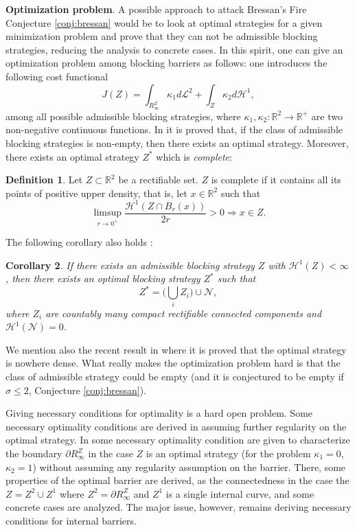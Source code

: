 \documentclass[reqno]{amsart}
\newcounter{assu}
\theoremstyle{definition} \newtheorem{definition}{Definition}[section]
\theoremstyle{definition} \newtheorem{remark}[definition]{Remark}
\theoremstyle{plain} \newtheorem{lemma}[definition]{Lemma}
\theoremstyle{plain} \newtheorem{proposition}[definition]{Proposition}
\theoremstyle{plain} \newtheorem{theorem}[definition]{Theorem}
\theoremstyle{plain} \newtheorem{corollary}[definition]{Corollary}
\theoremstyle{definition} \newtheorem{example}[definition]{Example}
\theoremstyle{plain} \newtheorem{claim}[clai]{Claim}
\theoremstyle{definition} \newtheorem{assumption}[definition]{Assumption}
\theoremstyle{definition} \newtheorem{observation}[definition]{Observation}
\newcommand{\R}{\mathbb{R}}
\newcommand{\1}{\mathbbm 1}
\renewcommand{\H}{\mathscr H}
\numberwithin{equation}{section} %
\theoremstyle{plain} \newtheorem*{theorem*}{Theorem}
\theoremstyle{plain} \newtheorem{mthm}[maintheorem]{Main Theorem}
\theoremstyle{plain} \newtheorem*{mthm*}{Main Theorem}
\theoremstyle{plain} \newtheorem*{conjecture*}{Conjecture}
\theoremstyle{plain} \newtheorem{conjecture}[definition]{Conjecture}
\theoremstyle{plain} \newtheorem*{problem*}{Problem}
\begin{document}
 \textbf{Optimization problem}. A possible approach to attack Bressan's Fire Conjecture \eqref{conj:bressan} would be to look at optimal strategies for a given minimization problem and prove that they can not be admissible blocking strategies, reducing the analysis to concrete cases. In this spirit, one  can give an optimization problem among blocking barriers as follows: one introduces the following cost functional
\begin{equation}\label{eq:opt:problem}
    J(Z)=\int_{R^Z_\infty} \kappa_1 d\mathcal{L}^2 +\int_{Z}\kappa_2 d\H^1,
\end{equation}
among all possible admissible blocking strategies, where $\kappa_1,\kappa_2:\R^2\rightarrow \R^+$ are two non-negative continuous functions. In \cite{Bressan_deLellis} it is proved that, if the class of admissible blocking strategies is non-empty, then there exists an optimal strategy. Moreover, there exists an optimal strategy $Z^*$ which is \emph{complete}:
\begin{definition}
Let $Z\subset\R^2$ be a rectifiable set. $Z$ is complete if it contains all its points of positive upper density,  that is, let $x\in\R^2$ such that
\begin{equation*}
\limsup_{r\to 0^+} \frac{\H^1(Z\cap B_r(x))}{2r}>0 \Longrightarrow x\in Z.
\end{equation*}
\end{definition}
 The following corollary also holds \cite{Bressan_equivalent}:
\begin{corollary}
If there exists an admissible blocking strategy $Z$ with $\H^1(Z)<\infty$, then there exists an optimal blocking strategy $Z^*$ such that
\begin{equation*}
Z^* = \bigg( \bigcup_i Z_i \bigg) \cup \mathcal{N},
\end{equation*}
where $Z_i$ are countably many compact rectifiable connected components and $\H^1(\mathcal{N})=0$.
\end{corollary}
We mention also the recent result in \cite{Bressan_Chiri} where it is proved that the optimal strategy is nowhere dense.  
What really makes the optimization problem hard is that the class of admissible strategy could be empty (and it is conjectured to be empty if $\sigma\leq 2$, Conjecture \ref{conj:bressan}).

Giving necessary conditions for optimality is a hard open problem. Some necessary optimality conditions are derived in \cite{Bressan_optnec} assuming further regularity on the optimal strategy. In \cite{FireSegment} some necessary optimality condition are given to characterize the boundary $\partial R^Z_\infty$ in the case $Z$ is an optimal strategy (for the problem $\kappa_1=0$, $\kappa_2=1$) without assuming any regularity assumption on the barrier. There, some properties of the optimal barrier are derived, as the connectedness in the case the $Z=Z^2\cup Z^1$ where $Z^2=\partial R^Z_\infty$ and $Z^1$ is a single internal curve, and some concrete cases are analyzed. The major issue, however, remains deriving necessary conditions for internal barriers.
\end{document}
